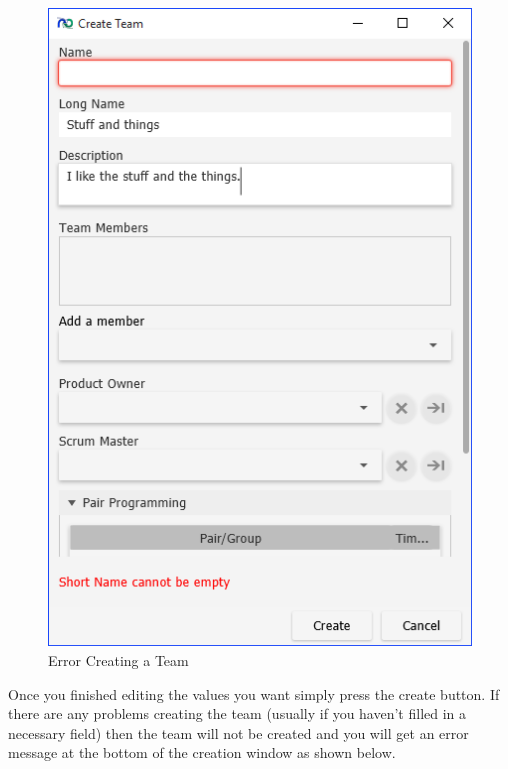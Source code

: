 \begin{figure}[H]
	\centering
	\includegraphics[width=\textwidth]{images/screenshots/teams3.PNG}
	\caption{Error Creating a Team}
	\label{fig:new_project}
\end{figure}

Once you finished editing the values you want simply press the create button. If there are any problems creating the team (usually if you haven't filled in a necessary field) then the team will not be created and you will get an error message at the bottom of the creation window as shown below.

